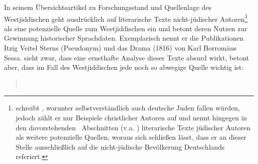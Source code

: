 \noindent In seinem Übersichtsartikel zu Forschungsstand und Quellenlage des Westjiddischen geht \cite[62--63]{Weinreich1953} ausdrücklich auf literarische Texte nicht-jüdischer Autoren\footnote{\cite[62]{Weinreich1953} schreibt  , worunter selbstverständlich auch deutsche Juden fallen würden, jedoch zählt er nur Beispiele christlicher Autoren auf und nennt hingegen in den davorstehenden \,%
Abschnitten (v.a. \citealt[40–42, 46]{Weinreich1953}) literarische Texte jüdischer Autoren als weitere potenzielle Quellen, woraus sich schließen lässt, dass er an dieser Stelle ausschließlich auf die nicht-jüdische Bevölkerung Deutschlands referiert.} als eine potenzielle Quelle zum Westjiddischen ein und betont deren Nutzen zur Gewinnung historischer Sprachdaten. Exemplarisch nennt er die Publikationen Itzig Veitel Sterns (Pseudonym) und das Drama  (1816) von Karl Borromäus Sessa. \citeauthor{Weinreich1953} sieht zwar, dass eine ernsthafte Analyse dieser Texte absurd wirkt, betont aber, dass im Fall des Westjiddischen jede noch so abwegige Quelle wichtig ist:

\begin{quote}
{\begin{flushright}  \end{flushright}}


{\begin{flushright}  \end{flushright}}
{}\\
\end{quote}



